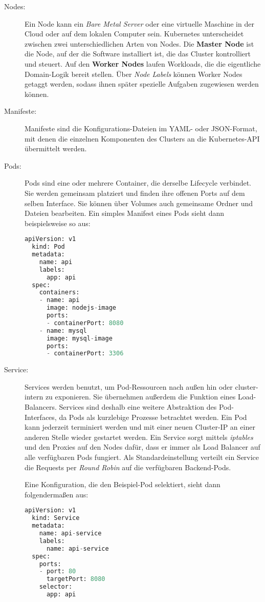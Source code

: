 \begin{description}
  \item[Nodes:]
  Ein Node kann ein \emph{Bare Metal Server} oder eine virtuelle Maschine
  in der Cloud oder auf dem lokalen Computer sein.
  Kubernetes unterscheidet zwischen zwei unterschiedlichen Arten von Nodes. Die
  \textbf{Master Node} ist die Node, auf der die Software installiert ist,
  die das Cluster kontrolliert und steuert. Auf den \textbf{Worker Nodes} laufen
  Workloads, die die
  eigentliche Domain-Logik bereit stellen. Über \emph{Node Labels} können
  Worker Nodes getaggt werden, sodass ihnen später spezielle Aufgaben
  zugewiesen werden können.
  \item[Manifeste:]
  Manifeste sind die Konfigurations-Dateien im YAML- oder JSON-Format, mit denen
  die einzelnen Komponenten des Clusters an die Kubernetes-API
  übermittelt werden.
  \item[Pods:]
  Pods sind eine oder mehrere Container, die derselbe Lifecycle verbindet.
  Sie werden gemeinsam platziert und finden ihre offenen Ports auf dem selben
   Interface.
  Sie können über Volumes auch gemeinsame Ordner und Dateien bearbeiten.
  Ein simples Manifest eines Pods sieht dann beispielsweise so aus:
  \begin{lstlisting}[language=Python,numbers=none]
  apiVersion: v1
  kind: Pod
  metadata:
    name: api
    labels:
      app: api
  spec:
    containers:
    - name: api
      image: nodejs-image
      ports:
      - containerPort: 8080
    - name: mysql
      image: mysql-image
      ports:
      - containerPort: 3306  \end{lstlisting}

  \item[Service:]
  Services werden benutzt, um Pod-Ressourcen nach außen hin oder cluster-intern
  zu exponieren.
  Sie übernehmen außerdem die Funktion eines Load-Balancers.
  Services sind deshalb eine weitere Abstraktion des Pod-Interfaces, da Pods als
  kurzlebige Prozesse betrachtet werden. Ein Pod kann jederzeit terminiert werden
  und mit einer neuen Cluster-IP an einer anderen Stelle wieder gestartet werden.
  Ein Service sorgt mittels \emph{iptables} und den Proxies auf den Nodes dafür,
  dass er immer als Load Balancer auf alle verfügbaren Pods fungiert.
  Als Standardeinstellung verteilt ein Service die Requests per \emph{Round Robin}
  auf die verfügbaren Backend-Pods. \cite{networkingBla}

  Eine Konfiguration, die den Beispiel-Pod selektiert, sieht dann
  folgendermaßen aus:
  \begin{lstlisting}[language=Python,numbers=none]
  apiVersion: v1
  kind: Service
  metadata:
    name: api-service
    labels:
      name: api-service
  spec:
    ports:
    - port: 80
      targetPort: 8080
    selector:
      app: api \end{lstlisting}


\end{description}
